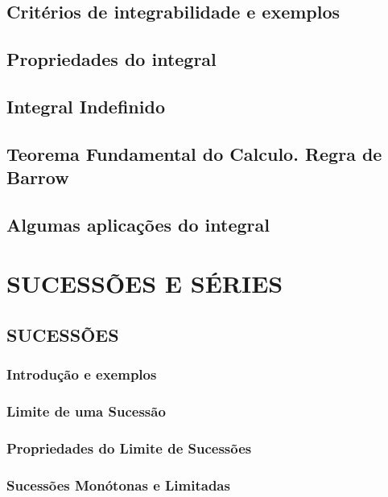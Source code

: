 \documentclass[11pt]{article}
\begin{document}
\subsection{Critérios de integrabilidade e exemplos}

\subsection{Propriedades do integral}

\subsection{Integral Indefinido}

\subsection{Teorema Fundamental do Calculo. Regra de Barrow}

\subsection{Algumas aplicações do integral}



\newpage

\section{\MakeUppercase{Sucessões e Séries}}

\subsection{\MakeUppercase{Sucessões}}

\subsubsection{Introdução e exemplos}

\subsubsection{Limite de uma Sucessão}

\subsubsection{Propriedades do Limite de Sucessões}

\subsubsection{Sucessões Monótonas e Limitadas}
\end{document}
